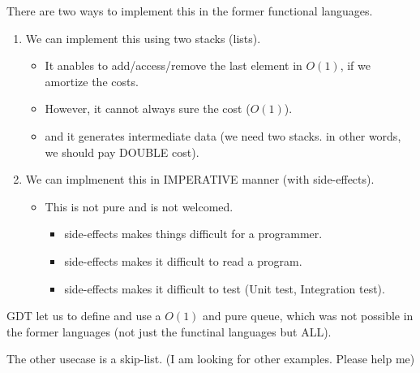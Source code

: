 \documentclass[11pt]{article}
\begin{document}
There are two ways to implement this in the former functional languages.
\begin{enumerate}
\item We can implement this using two stacks (lists).
\begin{itemize}
\item It anables to add/access/remove the last element in \(O(1)\), 
if we amortize the costs.
\item However, it cannot always sure the cost (\(O(1)\)).
\item and it generates intermediate data
(we need two stacks. in other words, we should pay DOUBLE cost).
\end{itemize}
\item We can implmenent this in IMPERATIVE manner (with side-effects).
\begin{itemize}
\item This is not pure and is not welcomed.
\begin{itemize}
\item side-effects makes things difficult for a programmer.
\item side-effects makes it difficult to read a program.
\item side-effects makes it difficult to test (Unit test, Integration test).
\end{itemize}
\end{itemize}
\end{enumerate}


GDT let us to define and use a \(O(1)\) and pure queue, which was not possible
in the former languages (not just the functinal languages but ALL).

The other usecase is a skip-list.
(I am looking for other examples. Please help me)
\end{document}
